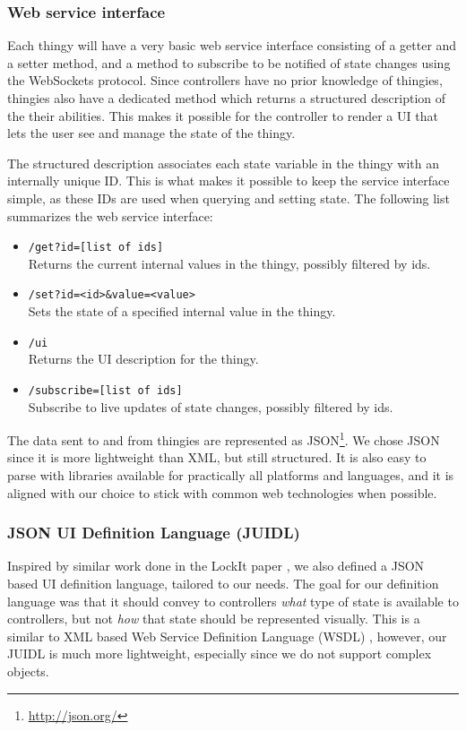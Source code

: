 \documentclass{ubicomp2012}
\begin{document}
\subsubsection{Web service interface}

Each thingy will have a very basic web service interface consisting of a getter and a setter method, and a method to subscribe to be notified of state changes using the WebSockets protocol. Since controllers have no prior knowledge of thingies, thingies also have a dedicated method which returns a structured description of the their abilities. This makes it possible for the controller to render a UI that lets the user see and manage the state of the thingy.

The structured description associates each state variable in the thingy with an internally unique ID. This is what makes it possible to keep the service interface simple, as these IDs are used when querying and setting state. The following list summarizes the web service interface:

\begin{itemize}
\item \lstinline{/get?id=[list of ids]}\\
Returns the current internal values in the thingy, possibly filtered by ids.
\item \lstinline{/set?id=<id>&value=<value>}\\
Sets the state of a specified internal value in the thingy.
\item \lstinline{/ui}\\
Returns the UI description for the thingy.
\item \lstinline{/subscribe=[list of ids]}\\
Subscribe to live updates of state changes, possibly filtered by ids.
\end{itemize}

The data sent to and from thingies are represented as JSON\footnote{\url{http://json.org/}}. We chose JSON since it is more lightweight than XML, but still structured. It is also easy to parse with libraries available for practically all platforms and languages, and it is aligned with our choice to stick with common web technologies when possible.

\subsubsection{JSON UI Definition Language (JUIDL)}

Inspired by similar work done in the LockIt paper \cite{lockit}, we also defined a JSON based UI definition language, tailored to our needs. The goal for our definition language was that it should convey to controllers \emph{what} type of state is available to controllers, but not \emph{how} that state should be represented visually. This is a similar to XML based Web Service Definition Language (WSDL) \cite{Christensen2001}, however, our JUIDL is much more lightweight, especially since we do not support complex objects.
\end{document}
